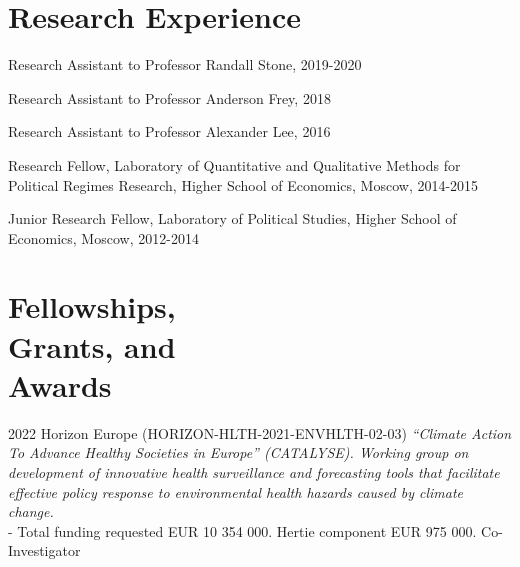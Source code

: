 \documentclass[margin,line,10.95pt]{res}
\begin{document}
\begin{resume}









\section{\sc Research Experience}

Research Assistant to Professor Randall Stone, 2019-2020 

\vspace*{-4.5mm}
Research Assistant to Professor Anderson Frey, 2018

\vspace*{-4.5mm}
Research Assistant to Professor Alexander Lee, 2016

\vspace*{-2.5mm}
Research Fellow, Laboratory of Quantitative and Qualitative Methods 
for Political Regimes Research, Higher School of Economics, Moscow, 2014-2015 

\vspace*{-4.5mm}
Junior Research Fellow, Laboratory of Political Studies, Higher School of Economics, Moscow, 2012-2014 

\section{\sc Fellowships,   \\ Grants,  and  \\Awards}

2022 Horizon Europe (HORIZON-HLTH-2021-ENVHLTH-02-03) \textit{“Climate Action To Advance Healthy Societies in Europe” (CATALYSE). Working group on development of innovative health surveillance and forecasting tools that facilitate effective policy response to environmental health hazards caused by climate change.} 
\\
- Total funding requested EUR 10 354 000. Hertie component EUR 975 000. Co-Investigator

\vspace*{-3.5mm}


\end{resume}
\end{document}
